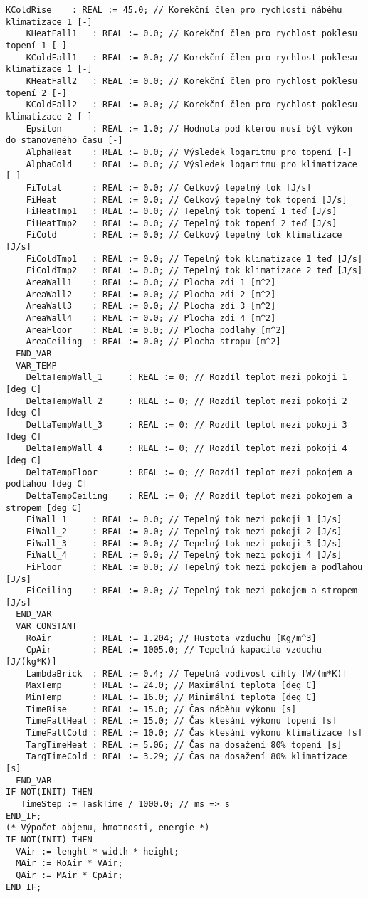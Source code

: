 \begin{lstlisting}[language=ST]
    KColdRise    : REAL := 45.0; // Korekční člen pro rychlosti náběhu klimatizace 1 [-]
    KHeatFall1   : REAL := 0.0; // Korekční člen pro rychlost poklesu topení 1 [-]
    KColdFall1   : REAL := 0.0; // Korekční člen pro rychlost poklesu klimatizace 1 [-]
    KHeatFall2   : REAL := 0.0; // Korekční člen pro rychlost poklesu topení 2 [-]
    KColdFall2   : REAL := 0.0; // Korekční člen pro rychlost poklesu klimatizace 2 [-]
    Epsilon      : REAL := 1.0; // Hodnota pod kterou musí být výkon do stanoveného času [-]
    AlphaHeat    : REAL := 0.0; // Výsledek logaritmu pro topení [-]
    AlphaCold    : REAL := 0.0; // Výsledek logaritmu pro klimatizace [-]
    FiTotal      : REAL := 0.0; // Celkový tepelný tok [J/s]
    FiHeat       : REAL := 0.0; // Celkový tepelný tok topení [J/s]
    FiHeatTmp1   : REAL := 0.0; // Tepelný tok topení 1 teď [J/s]
    FiHeatTmp2   : REAL := 0.0; // Tepelný tok topení 2 teď [J/s]
    FiCold       : REAL := 0.0; // Celkový tepelný tok klimatizace [J/s]
    FiColdTmp1   : REAL := 0.0; // Tepelný tok klimatizace 1 teď [J/s]
    FiColdTmp2   : REAL := 0.0; // Tepelný tok klimatizace 2 teď [J/s]
    AreaWall1    : REAL := 0.0; // Plocha zdi 1 [m^2]
    AreaWall2    : REAL := 0.0; // Plocha zdi 2 [m^2]
    AreaWall3    : REAL := 0.0; // Plocha zdi 3 [m^2]
    AreaWall4    : REAL := 0.0; // Plocha zdi 4 [m^2]
    AreaFloor    : REAL := 0.0; // Plocha podlahy [m^2]
    AreaCeiling  : REAL := 0.0; // Plocha stropu [m^2]
  END_VAR
  VAR_TEMP
    DeltaTempWall_1     : REAL := 0; // Rozdíl teplot mezi pokoji 1 [deg C]
    DeltaTempWall_2     : REAL := 0; // Rozdíl teplot mezi pokoji 2 [deg C]
    DeltaTempWall_3     : REAL := 0; // Rozdíl teplot mezi pokoji 3 [deg C]
    DeltaTempWall_4     : REAL := 0; // Rozdíl teplot mezi pokoji 4 [deg C]
    DeltaTempFloor      : REAL := 0; // Rozdíl teplot mezi pokojem a podlahou [deg C]
    DeltaTempCeiling    : REAL := 0; // Rozdíl teplot mezi pokojem a stropem [deg C]
    FiWall_1     : REAL := 0.0; // Tepelný tok mezi pokoji 1 [J/s]
    FiWall_2     : REAL := 0.0; // Tepelný tok mezi pokoji 2 [J/s]
    FiWall_3     : REAL := 0.0; // Tepelný tok mezi pokoji 3 [J/s]
    FiWall_4     : REAL := 0.0; // Tepelný tok mezi pokoji 4 [J/s]
    FiFloor      : REAL := 0.0; // Tepelný tok mezi pokojem a podlahou [J/s]
    FiCeiling    : REAL := 0.0; // Tepelný tok mezi pokojem a stropem [J/s]
  END_VAR
  VAR CONSTANT
    RoAir        : REAL := 1.204; // Hustota vzduchu [Kg/m^3]
    CpAir        : REAL := 1005.0; // Tepelná kapacita vzduchu [J/(kg*K)]
    LambdaBrick  : REAL := 0.4; // Tepelná vodivost cihly [W/(m*K)]
    MaxTemp      : REAL := 24.0; // Maximální teplota [deg C]
    MinTemp      : REAL := 16.0; // Minimální teplota [deg C]
    TimeRise     : REAL := 15.0; // Čas náběhu výkonu [s]
    TimeFallHeat : REAL := 15.0; // Čas klesání výkonu topení [s]
    TimeFallCold : REAL := 10.0; // Čas klesání výkonu klimatizace [s]
    TargTimeHeat : REAL := 5.06; // Čas na dosažení 80% topení [s]
    TargTimeCold : REAL := 3.29; // Čas na dosažení 80% klimatizace [s]
  END_VAR
IF NOT(INIT) THEN
   TimeStep := TaskTime / 1000.0; // ms => s
END_IF;
(* Výpočet objemu, hmotnosti, energie *)
IF NOT(INIT) THEN
  VAir := lenght * width * height;
  MAir := RoAir * VAir;
  QAir := MAir * CpAir;
END_IF;


\end{lstlisting}
